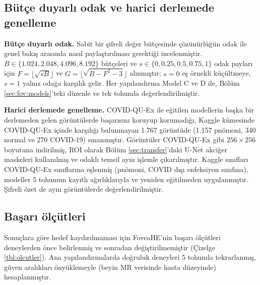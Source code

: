 \subsection{Bütçe duyarlı odak ve harici derlemede genelleme}\label{sec:fov:bonus}

\textbf{Bütçe duyarlı odak.} Sabit bir şifreli değer bütçesinde çözünürlüğün odak ile genel bakış arasında nasıl paylaştırılması gerektiği incelenmiştir. $B \in \{1.024, 2.048, 4.096, 8.192\}$ bütçeleri ve $s \in \{0, 0.25, 0.5, 0.75, 1\}$ odak payları için $F = \lfloor \sqrt{sB} \rfloor$ ve $G = \lfloor \sqrt{B - F^2 - 3} \rfloor$ alınmıştır; $s = 0$ eş örnekli küçültmeye, $s = 1$ yalnız odağa karşılık gelir. Her yapılandırma Model C ve D ile, Bölüm \ref{sec:fov:models}'teki düzenle ve tek tohumla değerlendirilmiştir.

\textbf{Harici derlemede genelleme.} COVID-QU-Ex ile eğitilen modellerin başka bir derlemeden gelen görüntülerde başarısını koruyup korumadığı, Kaggle kümesinde COVID-QU-Ex içinde karşılığı bulunmayan 1.767 görüntüde (1.157 pnömoni, 340 normal ve 270 COVID-19) sınanmıştır. Görüntüler COVID-QU-Ex gibi $256 \times 256$ boyutuna indirilmiş, ROI olarak Bölüm \ref{sec:transfer}'daki U-Net akciğer maskeleri kullanılmış ve odaklı temsil aynı işlemle çıkarılmıştır. Kaggle sınıfları COVID-QU-Ex sınıflarına eşlenmiş (pnömoni, COVID dışı enfeksiyon sınıfına), modeller 5 tohumun kayıtlı ağırlıklarıyla ve yeniden eğitilmeden uygulanmıştır. Şifreli özet de aynı görüntülerde değerlendirilmiştir.

\subsection{Başarı ölçütleri}\label{sec:fov:criteria}

Sonuçlara göre hedef kaydırılmaması için FoveaHE'nin başarı ölçütleri deneylerden önce belirlenmiş ve sonradan değiştirilmemiştir (Çizelge \ref{tbl:olcutler}). Ana yapılandırmalarda doğruluk deneyleri 5 tohumla tekrarlanmış, güven aralıkları önyüklemeyle (beyin MR verisinde hasta düzeyinde) hesaplanmıştır.

